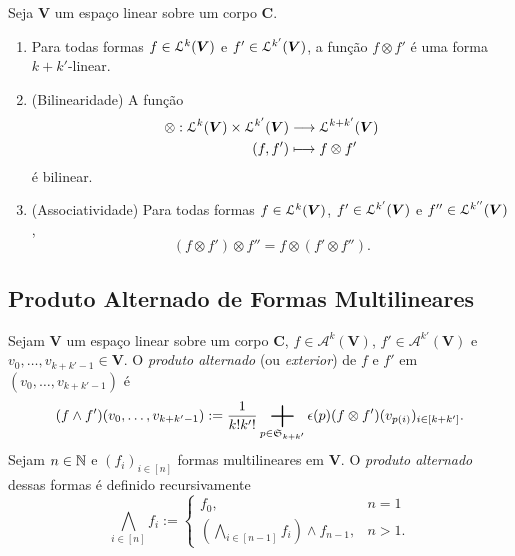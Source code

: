 \begin{prop}
Seja $\bm V$ um espaço linear sobre um corpo $\bm C$.
	\begin{enumerate}
	\item Para todas formas $f \in \mathcal{L}^k(\bm V)$ e $f' \in \mathcal{L}^{k'}(\bm V)$, a função $f \otimes f'$ é uma forma $k+k'$-linear.
	\item (Bilinearidade) A função
		\begin{align*}
		{\otimes}: {\mathcal{L}^k(\bm V) \times \mathcal{L}^{k'}(\bm V)} &\longrightarrow {\mathcal{L}^{k+k'}(\bm V)} \\{(f,f')} &\longmapsto {f \otimes f'}
		\end{align*}
é bilinear.
	\item (Associatividade) Para todas formas $f \in \mathcal{L}^k(\bm V)$, $f' \in \mathcal{L}^{k'}(\bm V)$ e $f'' \in \mathcal{L}^{k''}(\bm V)$,
		\begin{equation*}
		(f \otimes f') \otimes f'' = f \otimes (f' \otimes f'').
		\end{equation*}
	\end{enumerate}
\end{prop}

\subsection{Produto Alternado de Formas Multilineares}

\begin{defi}
Sejam $\bm V$ um espaço linear sobre um corpo $\bm C$, $f \in \mathcal{A}^k(\bm V)$, $f' \in \mathcal{A}^{k'}(\bm V)$ e $v_0,\ldots,v_{k+k'-1} \in \bm V$. O \emph{produto alternado} (ou \emph{exterior}) de $f$ e $f'$ em $(v_0,\ldots,v_{k+k'-1})$ é
	\begin{equation*}
	(f \wedge f')(v_0,\ldots,v_{k+k'-1}) := \frac{1}{k!k'!} \sum_{p \in \sime_{k+k'}} \prd(p) (f \otimes f')(v_{p(i)})_{i \in [k+k']}.
	\end{equation*}
Sejam $n \in \mathbb{N}$ e $(f_i)_{i \in [n]}$ formas multilineares em $\bm V$. O \emph{produto alternado} dessas formas é definido recursivamente
	\begin{equation*}
	\bigwedge_{i \in [n]} f_i := \begin{cases}
		f_0,& n=1 \\
		\left(\displaystyle\bigwedge_{i \in [n-1]} f_i \right) \wedge f_{n-1} ,& n>1.
	\end{cases}
	\end{equation*}
\end{defi}

